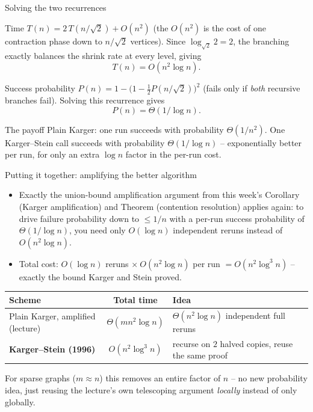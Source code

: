 \documentclass[11pt,aspectratio=169]{beamer}
\begin{document}
\begin{frame}{Solving the two recurrences}
  \small
  \begin{block}{Time}
    $T(n) = 2\,T(n/\sqrt2) + O(n^2)$ (the $O(n^2)$ is the cost of one contraction phase
    down to $n/\sqrt2$ vertices). Since $\log_{\sqrt2} 2 = 2$, the branching exactly
    balances the shrink rate at every level, giving
    \[
      T(n) = O(n^2 \log n).
    \]
  \end{block}
  \begin{block}{Success probability}
    $P(n) = 1 - \bigl(1 - \tfrac12 P(n/\sqrt2)\bigr)^2$ (fails only if \emph{both}
    recursive branches fail). Solving this recurrence gives
    \[
      P(n) = \Theta(1/\log n).
    \]
  \end{block}
  \begin{exampleblock}{The payoff}
    Plain Karger: one run succeeds with probability $\Theta(1/n^2)$. One
    Karger--Stein call succeeds with probability $\Theta(1/\log n)$ -- exponentially
    better per run, for only an extra $\log n$ factor in the per-run cost.
  \end{exampleblock}
\end{frame}

\begin{frame}{Putting it together: amplifying the better algorithm}
  \small
  \begin{itemize}
    \item Exactly the union-bound amplification argument from this week's Corollary
    (Karger amplification) and Theorem (contention resolution) applies again: to drive
    failure probability down to $\le 1/n$ with a per-run success probability of
    $\Theta(1/\log n)$, you need only $O(\log n)$ independent reruns instead of
    $O(n^2\log n)$.
    \item Total cost: $O(\log n)$ reruns $\times\ O(n^2\log n)$ per run
    $= O(n^2\log^3 n)$ -- exactly the bound Karger and Stein proved.
  \end{itemize}
  \begin{center}
  \begin{tabular}{@{}l c p{4.3cm}@{}}
    \toprule
    Scheme & Total time & Idea \\
    \midrule
    Plain Karger, amplified (lecture) & $\Theta(mn^2\log n)$ & $\Theta(n^2\log n)$
    independent full reruns \\
    \textbf{Karger--Stein (1996)} & $O(n^2\log^3 n)$ & recurse on $2$ halved copies,
    reuse the same proof \\
    \bottomrule
  \end{tabular}
  \end{center}
  For sparse graphs ($m \approx n$) this removes an entire factor of $n$ -- no new
  probability idea, just reusing the lecture's own telescoping argument \emph{locally}
  instead of only globally.
\end{frame}
\end{document}
